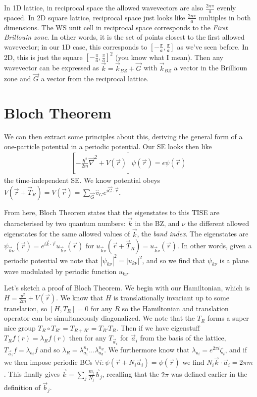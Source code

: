 \documentclass[10pt]{report}
\newcommand{\abs}[1]{\left|#1\right|}
\begin{document}
In 1D lattice, in reciprocal space the allowed wavevectors are also $\frac{2n\pi}{a}$ evenly spaced. In 2D square lattice, reciprocal space just looks like $\frac{2n\pi}{a}$ multiples in both dimensions. The WS unit cell in reciprocal space corresponds to the \emph{First Brillouin zone}. In other words, it is the set of points closest to the first allowed wavevector; in our 1D case, this corresponds to $\left[ -\frac{\pi}{a}, \frac{\pi}{a} \right]$ as we've seen before. In 2D, this is just the square $\left[ -\frac{\pi}{a}, \frac{\pi}{a} \right]^2$ (you know what I mean). Then any wavevector can be expressed as $\vec{k} = \vec{k}_{BZ} + \vec{G}$ with $\vec{k}_{BZ}$ a vector in the Brillioun zone and $\vec{G}$ a vector from the reciprocal lattice.

\section{Bloch Theorem}

We can then extract some principles about this, deriving the general form of a one-particle potential in a periodic potential. Our SE looks then like
\begin{align}
    \left[-\frac{\hbar^2}{2m}\vec{\nabla}^2 + V(\vec{r})\right] \psi(\vec{r}) = \epsilon \psi(\vec{r})
\end{align}
the time-independent SE. We know potential obeys $V(\vec{r} + \vec{T}_R) = V(\vec{r}) = \sum\limits_{\vec{G}}^{}\hat{v}_G e^{i\vec{G} \cdot \vec{r}}$. 

From here, Bloch Theorem states that the eigenstates to this TISE are characterised by two quantum numbers: $\vec{k}$ in the BZ, and $\nu$ the different allowed eigenstates for the same allowed values of $\vec{k}$, the \emph{band index}. The eigenstates are $\psi_{\vec{k}\nu}(\vec{r}) = e^{i\vec{k}\cdot \vec{r}}u_{\vec{k}\nu}(\vec{r})$ for $u_{\vec{k}\nu}(\vec{r} + \vec{T}_R) = u_{\vec{k}\nu}(\vec{r})$. In other words, given a periodic potential we note that $\abs{\psi_{k\nu}}^2 = \abs{u_{k\nu}}^2$, and so we find that $\psi_{k\nu}$ is a plane wave modulated by periodic function $u_{k\nu}$. 

Let's sketch a proof of Bloch Theorem. We begin with our Hamiltonian, which is $H = \frac{p^2}{2m} + V(\vec{r})$. We know that $H$ is translationally invariant up to some translation, so $\left[ H, T_R \right] = 0$ for any $R$ so the Hamiltonian and translation operator can be simultaneously diagonalized. We note that the $T_R$ forms a super nice group $T_R \circ T_{R'} = T_{R + R'} = T_{R'}T_R$. Then if we have eigenstuff $T_R f(r) = \lambda_R f(r)$ then for any $T_{\vec{a}_i}$ for $\vec{a}_i$ from the basis of the lattice, $T_{\vec{a}_i}f = \lambda_{a_i}f$ and so $\lambda_R = \lambda_{a_1}^{n_1}\dots\lambda_{a_d}^{n_d}$. We furthermore know that $\lambda_{a_i} = e^{2\pi i}\zeta_{i}$, and if we then impose periodic BCs $\forall i: \psi(\vec{r} + N_i\vec{a}_i) = \psi(\vec{r})$ we find $N_i\vec{k} \cdot \vec{a}_i = 2\pi m$. This finally gives $\vec{k} = \sum\limits_{j}^{}\frac{m_j}{N_j}\vec{b}_j$, recalling that the $2\pi$ was defined earlier in the definition of $\vec{b}_j$.
\end{document}
